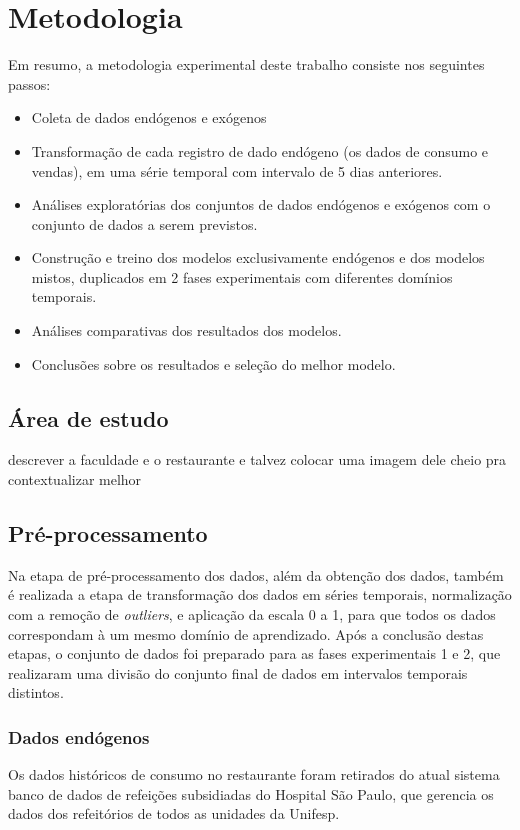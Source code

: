 
\chapter{Metodologia} \label{cap:metodos}
    Em resumo, a metodologia experimental deste trabalho consiste nos seguintes passos:
    \begin{itemize}
        \item Coleta de dados endógenos e exógenos
        \item Transformação de cada registro de dado endógeno (os dados de consumo e vendas), em uma série temporal com intervalo de 5 dias anteriores.
        \item Análises exploratórias dos conjuntos de dados endógenos e exógenos com o conjunto de dados a serem previstos.
        \item Construção e treino dos modelos exclusivamente endógenos e dos modelos mistos, duplicados em 2 fases experimentais com diferentes domínios temporais.
        \item Análises comparativas dos resultados dos modelos.
        \item Conclusões sobre os resultados e seleção do melhor modelo.
    \end{itemize}
    
    \section{Área de estudo}
    descrever a faculdade e o restaurante e talvez colocar uma imagem dele cheio pra contextualizar melhor
	\section{Pré-processamento}
	    Na etapa de pré-processamento dos dados, além da obtenção dos dados, também é realizada a etapa de transformação dos dados em séries temporais, normalização com a remoção de \textit{outliers}, e aplicação da escala 0 a 1, para que todos os dados correspondam à um mesmo domínio de aprendizado.
	    Após a conclusão destas etapas, o conjunto de dados foi preparado para as fases experimentais 1 e 2, que realizaram uma divisão do conjunto final de dados em intervalos temporais distintos.
	    
	    \subsection{Dados endógenos} \label{subsec:coleta_endogenos}
        	Os dados históricos de consumo no restaurante foram retirados do atual sistema banco de dados de refeições subsidiadas do Hospital São Paulo, que gerencia os dados dos refeitórios de todos as unidades da Unifesp.
        	
